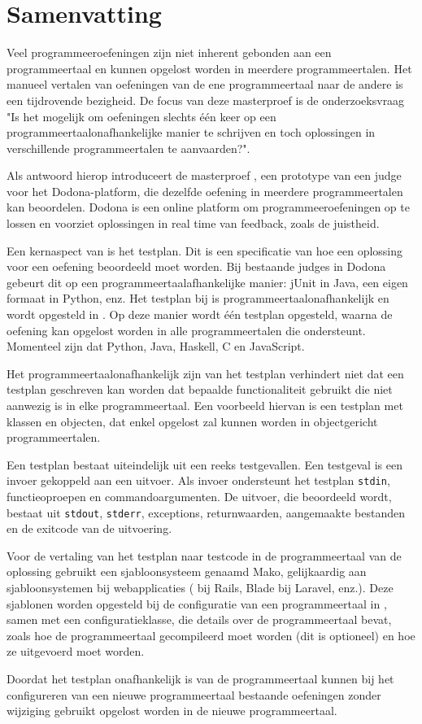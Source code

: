 \chapter*{Samenvatting}

Veel programmeeroefeningen zijn niet inherent gebonden aan een programmeertaal en kunnen opgelost worden in meerdere programmeertalen.
Het manueel vertalen van oefeningen van de ene programmeertaal naar de andere is een tijdrovende bezigheid.
De focus van deze masterproef is de onderzoeksvraag "Is het mogelijk om oefeningen slechts één keer op een programmeertaalonafhankelijke manier te schrijven en toch oplossingen in verschillende programmeertalen te aanvaarden?".

Als antwoord hierop introduceert de masterproef \tested{}, een prototype van een judge voor het Dodona-platform, die dezelfde oefening in meerdere programmeertalen kan beoordelen.
Dodona is een online platform om programmeeroefeningen op te lossen en voorziet oplossingen in real time van feedback, zoals de juistheid.

Een kernaspect van \tested{} is het testplan.
Dit is een specificatie van hoe een oplossing voor een oefening beoordeeld moet worden.
Bij bestaande judges in Dodona gebeurt dit op een programmeertaalafhankelijke manier: jUnit in Java, een eigen formaat in Python, enz.
Het testplan bij \tested{} is programmeertaalonafhankelijk en wordt opgesteld in .
Op deze manier wordt één testplan opgesteld, waarna de oefening kan opgelost worden in alle programmeertalen die \tested{} ondersteunt.
Momenteel zijn dat Python, Java, Haskell, C en JavaScript.

Het programmeertaalonafhankelijk zijn van het testplan verhindert niet dat een testplan geschreven kan worden dat bepaalde functionaliteit gebruikt die niet aanwezig is in elke programmeertaal.
Een voorbeeld hiervan is een testplan met klassen en objecten, dat enkel opgelost zal kunnen worden in objectgericht programmeertalen.

Een testplan bestaat uiteindelijk uit een reeks testgevallen.
Een testgeval is een invoer gekoppeld aan een uitvoer.
Als invoer ondersteunt het testplan \texttt{stdin}, functieoproepen en commandoargumenten.
De uitvoer, die beoordeeld wordt, bestaat uit \texttt{stdout}, \texttt{stderr}, exceptions, returnwaarden, aangemaakte bestanden en de exitcode van de uitvoering.

Voor de vertaling van het testplan naar testcode in de programmeertaal van de oplossing gebruikt \tested{} een sjabloonsysteem genaamd Mako, gelijkaardig aan sjabloonsystemen bij webapplicaties ( bij Rails, Blade bij Laravel, enz.).
Deze sjablonen worden opgesteld bij de configuratie van een programmeertaal in \tested{}, samen met een configuratieklasse, die details over de programmeertaal bevat, zoals hoe de programmeertaal gecompileerd moet worden (dit is optioneel) en hoe ze uitgevoerd moet worden.

Doordat het testplan onafhankelijk is van de programmeertaal kunnen bij het configureren van een nieuwe programmeertaal bestaande oefeningen zonder wijziging gebruikt opgelost worden in de nieuwe programmeertaal.
